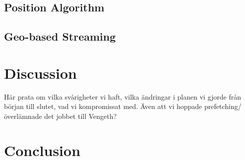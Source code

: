 \documentclass[9pt,a4paper]{acmproc}
\begin{document}
\subsection{Position Algorithm}

\subsection{Geo-based Streaming}


\section{Discussion}
Här prata om vilka svårigheter vi haft, vilka ändringar i planen vi gjorde från början till slutet, vad vi kompromissat med. Även att vi hoppade prefetching/överlämnade det jobbet till Vengeth?

\section{Conclusion}

\end{document}
